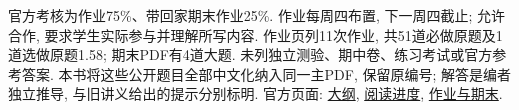 官方考核为作业75\%、带回家期末作业25\%. 作业每周四布置, 下一周四截止; 允许合作, 要求学生实际参与并理解所写内容. 作业页列11次作业, 共51道必做原题及1道选做原题1.58; 期末PDF有4道大题. 未列独立测验、期中卷、练习考试或官方参考答案. 本书将这些公开题目全部中文化纳入同一主PDF, 保留原编号; 解答是编者独立推导, 与旧讲义给出的提示分别标明. 官方页面: \href{https://ocw.mit.edu/courses/18-712-introduction-to-representation-theory-fall-2010/pages/syllabus/}{大纲}, \href{https://ocw.mit.edu/courses/18-712-introduction-to-representation-theory-fall-2010/pages/readings/}{阅读进度}, \href{https://ocw.mit.edu/courses/18-712-introduction-to-representation-theory-fall-2010/pages/assignments/}{作业与期末}.
